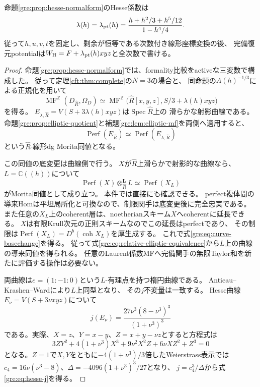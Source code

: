 \begin{theorem}[復元potentialの全次数有理式]
\label{gre:thm:exact-potential}
命題\ref{gre:prop:hesse-normalform}のHesse係数は
\begin{equation}\label{gre:eq:exact-potential}
 \lambda(h)=\lambda_{\rm pt}(h)
 =\frac{h+h^2/3+h^5/12}{1-h^4/4}.
\end{equation}
従って$h,u,v,t$を固定し、剰余が恒等である次数付き線形座標変換の後、
完備復元potentialは$W_{\rm H}=F+\lambda_{\rm pt}(h)xyz$と全次数で書ける。
\end{theorem}
\begin{proof}
命題\ref{gre:prop:hesse-normalform}では、formality比較をactiveな三変数で構成した。
従って定理\ref{cft:thm:complete}の$N=3$の場合と、
同命題の$A(h)^{-1/3}$による正規化を用いて
\[
 \operatorname{MF}^{\mathbb Z}(D_{\widehat R},\Omega_D)
 \simeq
 \operatorname{MF}^{\mathbb Z}\bigl(\widehat R[x,y,z],S/3+\lambda(h)xyz\bigr)
\]
を得る。
$E_{\lambda,\widehat R}=V(S+3\lambda(h)xyz)$は$\operatorname{Spec}\widehat R$上の
滑らかな射影曲線である。
命題\ref{gre:prop:elliptic-quotient}と補題\ref{gre:lem:elliptic-mf}を両側へ適用すると、
\begin{equation}\label{gre:eq:relative-elliptic-equivalence}
 \operatorname{Perf}(E_{\widehat R})
 \simeq\operatorname{Perf}(E_{\lambda,\widehat R})
\end{equation}
という$\widehat R$-線形dg Morita同値となる。

この同値の底変更は曲線側で行う。
$X$が$\widehat R$上滑らかで射影的な曲線なら、$L=\mathbb C((h))$について
\begin{equation}\label{gre:eq:curve-basechange}
 \operatorname{Perf}(X)\otimes_{\widehat R}^{\mathbf L}L
 \simeq\operatorname{Perf}(X_L)
\end{equation}
がMorita同値として成り立つ\cite[Section~3.4]{GRAKW}。
本件では直接にも確認できる。
perfect複体間の導来Homは平坦局所化と可換なので、制限関手は底変更後に完全忠実である。
また任意の$X_L$上のcoherent層は、noetherianスキーム$X$へcoherentに延長できる。
$X$は有限Krull次元の正則スキームなのでこの延長はperfectであり、
その制限は$\operatorname{Perf}(X_L)=D^b(\operatorname{coh}X_L)$を厚生成する。
これで式\eqref{gre:eq:curve-basechange}を得る。
従って式\eqref{gre:eq:relative-elliptic-equivalence}から$L$上の曲線の導来同値を得られる。
任意のLaurent係数MFへ完備関手の無限Taylor和を新たに評価する操作は必要ない。

両曲線は$e=(1:-1:0)$という$L$-有理点を持つ楕円曲線である。
Antieau--Krashen--Ward\cite[Theorem~2.2]{GRAKW}により$L$上同型となり、
その$j$不変量は一致する。
Hesse曲線$E_\nu=V(S+3\nu xyz)$について
\begin{equation}\label{gre:eq:hesse-j}
 j(E_\nu)=\frac{27\nu^3(8-\nu^3)^3}{(1+\nu^3)^3}
\end{equation}
である。実際、$X=z$、$Y=x-y$、$Z=x+y-\nu z$とすると方程式は
\[
 3ZY^2+4(1+\nu^3)X^3+9\nu^2X^2Z+6\nu XZ^2+Z^3=0
\]
となる。$Z=1$で$X,Y$をともに$-4(1+\nu^3)/3$倍したWeierstrass表示では
$c_4=16\nu(\nu^3-8)$、$\Delta=-4096(1+\nu^3)^3/27$となり、
$j=c_4^3/\Delta$から式\eqref{gre:eq:hesse-j}を得る。


\end{proof}
